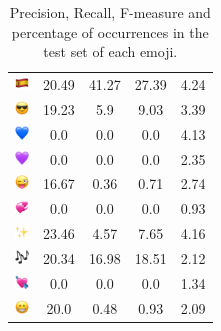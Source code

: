\documentclass{article}
\begin{document}
\begin{table}
\begin{tabular}{|c|ccc|c|}
\includegraphics[height=0.37cm,width=0.37cm]{img/Spain.png} & 20.49 & 41.27 & 27.39 & 4.24\\ 
\includegraphics[height=0.37cm,width=0.37cm]{img/smiling_face_with_sunglasses.png} & 19.23 & 5.9 & 9.03 & 3.39\\ 
\includegraphics[height=0.37cm,width=0.37cm]{img/blue_heart.png} & 0.0 & 0.0 & 0.0 & 4.13\\ 
\includegraphics[height=0.37cm,width=0.37cm]{img/purple_heart.png} & 0.0 & 0.0 & 0.0 & 2.35\\ 
\includegraphics[height=0.37cm,width=0.37cm]{img/winking_face_with_tongue.png} & 16.67 & 0.36 & 0.71 & 2.74\\ 
\includegraphics[height=0.37cm,width=0.37cm]{img/revolving_hearts.png} & 0.0 & 0.0 & 0.0 & 0.93\\ 
\includegraphics[height=0.37cm,width=0.37cm]{img/sparkles.png} & 23.46 & 4.57 & 7.65 & 4.16\\ 
\includegraphics[height=0.37cm,width=0.37cm]{img/musical_notes.png} & 20.34 & 16.98 & 18.51 & 2.12\\ 
\includegraphics[height=0.37cm,width=0.37cm]{img/heart_with_arrow.png} & 0.0 & 0.0 & 0.0 & 1.34\\ 
\includegraphics[height=0.37cm,width=0.37cm]{img/beaming_face_with_smiling_eyes.png} & 20.0 & 0.48 & 0.93 & 2.09\\ 

\hline
\end{tabular}
\caption{\label{table:emoji_detailed} Precision, Recall, F-measure and percentage of occurrences in the test set of each emoji.}
\end{table}
\end{document}

